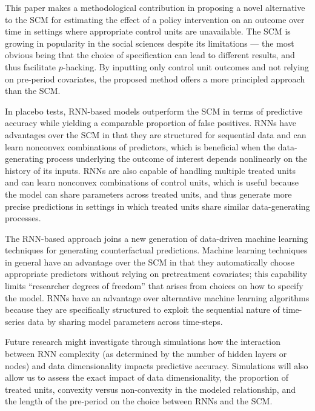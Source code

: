 \documentclass[hidelinks,12pt]{article}
\begin{document}
This paper makes a methodological contribution in proposing a novel alternative to the SCM for estimating the effect of a policy intervention on an outcome over time in settings where appropriate control units are unavailable. The SCM is growing in popularity in the social sciences despite its limitations --- the most obvious being that the choice of specification can lead to different results, and thus facilitate $p$-hacking. By inputting only control unit outcomes and not relying on pre-period covariates, the proposed method offers a more principled approach than the SCM. 

In placebo tests, RNN-based models outperform the SCM in terms of predictive accuracy while yielding a comparable proportion of false positives. RNNs have advantages over the SCM in that they are structured for sequential data and can learn nonconvex combinations of predictors, which is beneficial when the data-generating process underlying the outcome of interest depends nonlinearly on the history of its inputs. RNNs are also capable of handling multiple treated units and can learn nonconvex combinations of control units, which is useful because the model can share parameters across treated units, and thus generate more precise predictions in settings in which treated units share similar data-generating processes.

The RNN-based approach joins a new generation of data-driven machine learning techniques for generating counterfactual predictions. Machine learning techniques in general have an advantage over the SCM in that they automatically choose appropriate predictors without relying on pretreatment covariates; this capability limits ``researcher degrees of freedom'' that arises from choices on how to specify the model. RNNs have an advantage over alternative machine learning algorithms because they are specifically structured to exploit the sequential nature of time-series data by sharing model parameters across time-steps.

Future research might investigate through simulations how the interaction between RNN complexity (as determined by the number of hidden layers or nodes) and data dimensionality impacts predictive accuracy. Simulations will also allow us to assess the exact impact of data dimensionality, the proportion of treated units, convexity versus non-convexity in the modeled relationship, and the length of the pre-period on the choice between RNNs and the SCM. %

\newpage


\begin{singlespace}
	\begin{footnotesize}
		\begin{multicols}{2}
			
		\end{multicols}
	\end{footnotesize}
\end{singlespace}

\itemize
\end{document}
